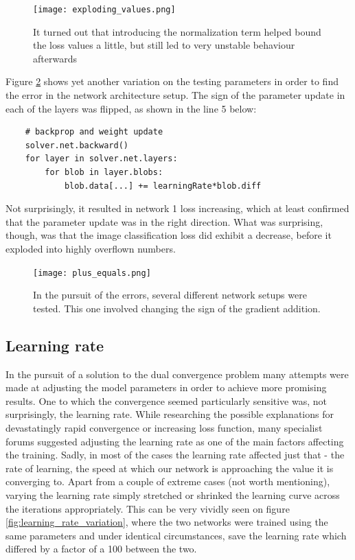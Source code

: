 \documentclass[a4paper, 11pt]{article}
\numberwithin{equation}{section}
\begin{document}
	\begin{figure}[!h]
		\centering
		\texttt{[image: exploding\_values.png]}
		\caption{\label{fig:exploding_values}{It turned out that introducing the normalization term helped bound the loss values a little, but still led to very unstable behaviour afterwards}}
	\end{figure}
	
	Figure \ref{fig:plus_equals} shows yet another variation on the testing parameters in order to find the error in the network architecture setup. The sign of the parameter update in each of the layers was flipped, as shown in the line 5 below: \\
	
	\begin{lstlisting}
	# backprop and weight update
	solver.net.backward()
	for layer in solver.net.layers:
	    for blob in layer.blobs:
 	        blob.data[...] += learningRate*blob.diff
	\end{lstlisting}
	
	Not surprisingly, it resulted in network 1 loss increasing, which at least confirmed that the parameter update was in the right direction. What was surprising, though, was that the image classification loss did exhibit a decrease, before it exploded into highly overflown numbers.
	
	\begin{figure}[!h]
		\centering
 		\texttt{[image: plus\_equals.png]}
		\caption{\label{fig:plus_equals}{In the pursuit of the errors, several different network setups were tested. This one involved changing the sign of the gradient addition.}}
	\end{figure}
	
	\subsection{Learning rate}
	
	In the pursuit of a solution to the dual convergence problem many attempts were made at adjusting the model parameters in order to achieve more promising results. One to which the convergence seemed particularly sensitive was, not surprisingly, the learning rate. While researching the possible explanations for devastatingly rapid convergence or increasing loss function, many specialist forums suggested adjusting the learning rate as one of the main factors affecting the training. Sadly, in most of the cases the learning rate affected just that - the rate of learning, the speed at which our network is approaching the value it is converging to. Apart from a couple of extreme cases (not worth mentioning), varying the learning rate simply stretched or shrinked the learning curve across the iterations appropriately. This can be very vividly seen on figure \ref{fig:learning_rate_variation}, where the two networks were trained using the same parameters and under identical circumstances, save the learning rate which differed by a factor of a 100 between the two.
	
\end{document}

